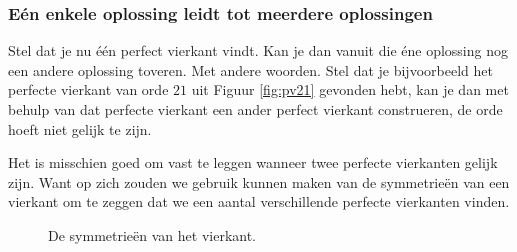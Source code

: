 \subsubsection{E\'en enkele oplossing leidt tot meerdere oplossingen}

Stel dat je nu \'e\'en perfect vierkant vindt. Kan je dan vanuit die \'ene oplossing nog een andere oplossing toveren. Met andere woorden. Stel dat je bijvoorbeeld het perfecte vierkant van orde $21$ uit Figuur \ref{fig:pv21} gevonden hebt, kan je dan met behulp van dat perfecte vierkant een ander perfect vierkant construeren, de orde hoeft niet gelijk te zijn.

Het is misschien goed om vast te leggen wanneer twee perfecte vierkanten gelijk zijn. Want op zich zouden we gebruik kunnen maken van de symmetrie\"en van een vierkant om te zeggen dat we een aantal verschillende perfecte vierkanten vinden.


\begin{figure}[ht]
  \centering
  



  \caption{De symmetrie\"en van het vierkant.}
  \label{fig:symmetrie_vierkant}
\end{figure}


\clearpage

